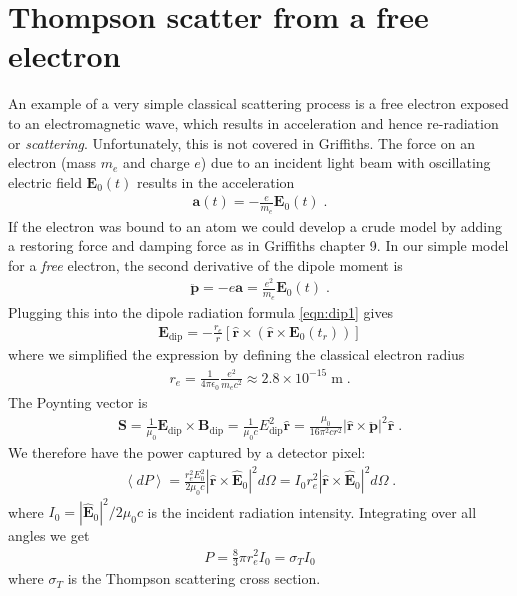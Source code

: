 \documentclass[12pt]{article}
\renewcommand{\vec}[1]{\boldsymbol{#1}}
\newcommand{\hvec}[1]{\hat{\vec{#1}}}
\newcommand{\avg}[1]{\left\langle #1 \right\rangle}
\begin{document}
\section{Thompson scatter from a free electron}

An example of a very simple classical scattering process is a free electron exposed to an electromagnetic wave, which
results in acceleration and hence re-radiation or \emph{scattering}.  Unfortunately, this is not covered in Griffiths.
The force on an electron (mass $m_e$ and charge $e$) due to an incident light beam with oscillating electric field
$\vec{E}_0(t)$ results in the acceleration
\begin{align}
\vec{a}(t) =  -\frac{e}{m_e} \vec{E}_0(t) \;.
\end{align}
If the electron was bound to an atom we could develop a crude model by adding a restoring force and damping force as in Griffiths chapter 9.  In our simple model for a \emph{free} electron, the second derivative of the dipole moment is 
\begin{align} \label{eqn:pddot_thompson}
\ddot{\vec{p}} =  -e \vec{a} = \frac{e^2}{m_e} \vec{E}_0(t) \;.
\end{align}  
Plugging this into the dipole radiation formula \ref{eqn:dip1} gives
\begin{align}
\vec{E}_\text{dip} =  -\frac{r_e}{r} [\hvec{r} \times ( \hvec{r} \times  \vec{E}_0(t_r))] 
\end{align}
where we simplified the expression by defining the classical electron radius
\begin{align}
r_e = \frac{1}{4\pi \epsilon_0} \frac{e^2}{m_e c^2} \approx 2.8\times10^{-15} \; \text{m} \;.
\end{align}
The Poynting vector is
\begin{align}
\vec{S} =  \frac{1}{\mu_0} \vec{E}_\text{dip}\times\vec{B}_\text{dip} =  
\frac{1}{\mu_0c} E_\text{dip}^2\hvec{r} 
= \frac{\mu_0}{16 \pi^2 cr^2} |\hvec{r} \times    \ddot{\vec{p}}|^2\hvec{r} 
\;.
\end{align}
We therefore have the power captured by a detector pixel:
\begin{align}\label{eqn:dpthompson}
\avg{dP}  = \frac{r_e^2 E_0^2}{ 2 \mu_0 c}  |\hvec{r}\times\hvec{E}_0|^2 d\Omega 
 = I_0 r_e^2  |\hvec{r}\times\hvec{E}_0|^2  d\Omega   \; .
\end{align}
where $I_0 = |\hvec{E}_0|^2/2\mu_0c$ is the incident radiation intensity.  Integrating over all angles we get
\begin{align}
P = \frac{8}{3}\pi r_e^2  I_0  = \sigma_T  I_0 
\end{align}
where $\sigma_T$ is the Thompson scattering cross section.
\end{document}

